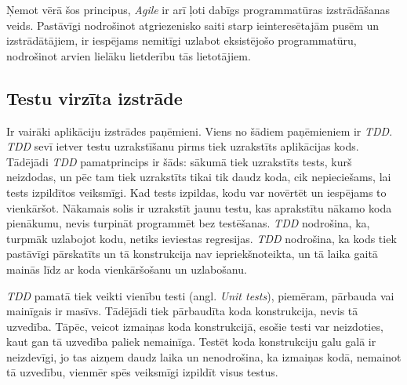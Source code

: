Ņemot vērā šos principus, \textit{Agile} ir arī ļoti dabīgs programmatūras izstrādāšanas veids. Pastāvīgi nodrošinot atgriezenisko saiti starp ieinteresētajām pusēm un izstrādātājiem, ir iespējams nemitīgi uzlabot eksistējošo programmatūru, nodrošinot arvien lielāku lietderību tās lietotājiem.
\cite{agile-man}


\subsection{Testu virzīta izstrāde}
Ir vairāki aplikāciju izstrādes paņēmieni. Viens no šādiem paņēmieniem ir \textit{TDD}. \textit{TDD} sevī ietver testu uzrakstīšanu pirms tiek uzrakstīts aplikācijas kods. Tādējādi \textit{TDD} pamatprincips ir šāds: sākumā tiek uzrakstīts tests, kurš neizdodas, un pēc tam tiek uzrakstīts tikai tik daudz koda, cik nepieciešams, lai tests izpildītos veiksmīgi. Kad tests izpildas, kodu var novērtēt un iespējams to vienkāršot. Nākamais solis ir uzrakstīt jaunu testu, kas aprakstītu nākamo koda pienākumu, nevis turpināt programmēt bez testēšanas. \textit{TDD} nodrošina, ka, turpmāk uzlabojot kodu, netiks ieviestas regresijas. \textit{TDD} nodrošina, ka kods tiek pastāvīgi pārskatīts un tā konstrukcija nav iepriekšnoteikta, un tā laika gaitā mainās līdz ar koda vienkāršošanu un uzlabošanu.

\textit{TDD} pamatā tiek veikti vienību testi (angl. \textit{Unit tests}), piemēram, pārbauda vai mainīgais ir masīvs. Tādējādi tiek pārbaudīta koda konstrukcija, nevis tā uzvedība. Tāpēc, veicot izmaiņas koda konstrukcijā, esošie testi var neizdoties, kaut gan tā uzvedība paliek nemainīga. Testēt koda konstrukciju galu galā ir neizdevīgi, jo tas aizņem daudz laika un nenodrošina, ka izmaiņas kodā, nemainot tā uzvedību, vienmēr spēs veiksmīgi izpildīt visus testus. \cite{chelimsky2010Rspec}

